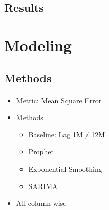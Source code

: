 \subsection{Results}

\begin{frame}{\insertsectionhead}
	\framesubtitle{\insertsubsectionhead}
\end{frame}

\section{Modeling}

\subsection{Methods}

\begin{frame}{\insertsectionhead}
	\framesubtitle{\insertsubsectionhead}
	\begin{itemize}
		\item<+-> Metric: Mean Square Error
		\item<+-> Methods
		\begin{itemize}
			\item<+-> Baseline: Lag 1M / 12M
			\item<+-> Prophet
			\item<+-> Exponential Smoothing
			\item<+-> SARIMA
		\end{itemize}
		\item<+-> All column-wise
	\end{itemize}
\end{frame}

